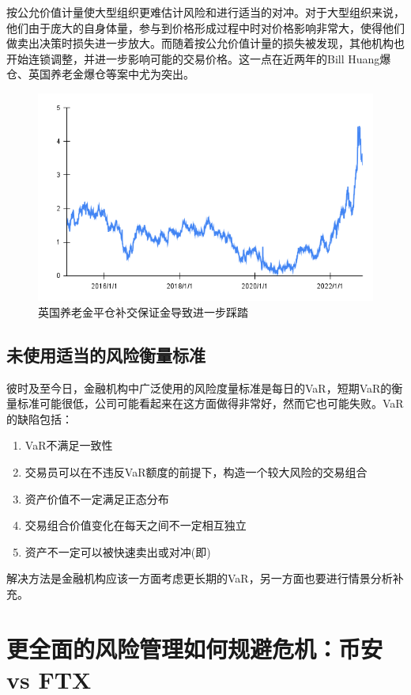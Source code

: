 按公允价值计量使大型组织更难估计风险和进行适当的对冲。对于大型组织来说，他们由于庞大的自身体量，参与到价格形成过程中时对价格影响非常大，使得他们做卖出决策时损失进一步放大。而随着按公允价值计量的损失被发现，其他机构也开始连锁调整，并进一步影响可能的交易价格。这一点在近两年的Bill Huang爆仓、英国养老金爆仓等案中尤为突出。
\begin{figure}[H]
    \includegraphics[width=\linewidth]{img/british_bond.png}
    \caption{英国养老金平仓补交保证金导致进一步踩踏}
\end{figure}

\subsection{未使用适当的风险衡量标准}\label{sec:6}
彼时及至今日，金融机构中广泛使用的风险度量标准是每日的VaR，短期VaR的衡量标准可能很低，公司可能看起来在这方面做得非常好，然而它也可能失败。VaR的缺陷包括：
\begin{enumerate}
    \item VaR不满足一致性
    \item 交易员可以在不违反VaR额度的前提下，构造一个较大风险的交易组合
    \item 资产价值不一定满足正态分布
    \item 交易组合价值变化在每天之间不一定相互独立
    \item 资产不一定可以被快速卖出或对冲(即)
\end{enumerate}

解决方法是金融机构应该一方面考虑更长期的VaR，另一方面也要进行情景分析补充。

\section{更全面的风险管理如何规避危机：币安vs FTX}

